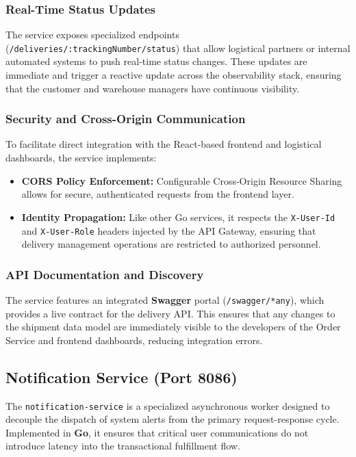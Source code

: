 \documentclass[12pt,a4paper]{report}
\begin{document}
\subsubsection{Real-Time Status Updates}
The service exposes specialized endpoints (\texttt{/deliveries/:trackingNumber/status}) that allow logistical partners or internal automated systems to push real-time status changes. These updates are immediate and trigger a reactive update across the observability stack, ensuring that the customer and warehouse managers have continuous visibility.

\subsubsection{Security and Cross-Origin Communication}
To facilitate direct integration with the React-based frontend and logistical dashboards, the service implements:
\begin{itemize}
    \item \textbf{CORS Policy Enforcement:} Configurable Cross-Origin Resource Sharing allows for secure, authenticated requests from the frontend layer.
    \item \textbf{Identity Propagation:} Like other Go services, it respects the \texttt{X-User-Id} and \texttt{X-User-Role} headers injected by the API Gateway, ensuring that delivery management operations are restricted to authorized personnel.
\end{itemize}

\subsubsection{API Documentation and Discovery}
The service features an integrated \textbf{Swagger} portal (\texttt{/swagger/*any}), which provides a live contract for the delivery API. This ensures that any changes to the shipment data model are immediately visible to the developers of the Order Service and frontend dashboards, reducing integration errors.

\subsection{Notification Service (Port 8086)}
The \texttt{notification-service} is a specialized asynchronous worker designed to decouple the dispatch of system alerts from the primary request-response cycle. Implemented in \textbf{Go}, it ensures that critical user communications do not introduce latency into the transactional fulfillment flow.
\end{document}
